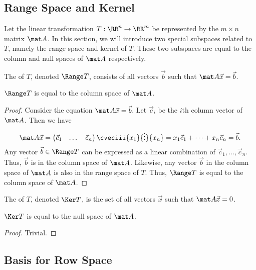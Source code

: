 \subsection{Range Space and Kernel}

Let the linear transformation $T : \RR^n \to \RR^m$ be represented by the $m \times n$ matrix $\mat A$. In this section, we will introduce two special subspaces related to $T$, namely the range space and kernel of $T$. These two subspaces are equal to the column and null spaces of $\mat A$ respectively.

\begin{definition}
    The  of $T$, denoted $\Range T$, consists of all vectors $\vec b$ such that $\mat A \vec x = \vec b$.
\end{definition}

\begin{proposition}
    $\Range T$ is equal to the column space of $\mat A$.
\end{proposition}
\begin{proof}
    Consider the equation $\mat A \vec x = \vec b$. Let $\vec c_i$ be the $i$th column vector of $\mat A$. Then we have \[\mat A \vec x =  \begin{pmatrix}\vec c_1 & \dots & \vec c_n\end{pmatrix} \cveciii{x_1}{\vdots}{x_n} = x_1 \vec c_1 + \dots + x_n \vec c_n = \vec b.\] Any vector $\vec b \in \Range T$ can be expressed as a linear combination of $\vec c_1, \dots, \vec c_n$. Thus, $\vec b$ is in the column space of $\mat A$. Likewise, any vector $\vec b$ in the column space of $\mat A$ is also in the range space of $T$. Thus, $\Range T$ is equal to the column space of $\mat A$.
\end{proof}

\begin{definition}
    The  of $T$, denoted $\Ker T$, is the set of all vectors $\vec x$ such that $\mat A \vec x = 0$.
\end{definition}

\begin{proposition}
    $\Ker T$ is equal to the null space of $\mat A$.
\end{proposition}
\begin{proof}
    Trivial.
\end{proof}

\subsection{Basis for Row Space}

